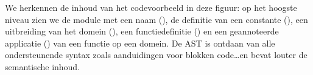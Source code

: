 We herkennen de inhoud van het codevoorbeeld in deze figuur: op het hoogste
niveau zien we de module met een naam (), de definitie van een
constante (), een uitbreiding van het domein (), een
functiedefinitie () en een geannoteerde applicatie
() van een functie op een domein. De AST is ontdaan van alle
ondersteunende syntax zoals aanduidingen voor blokken code\dots en bevat louter
de semantische inhoud.
